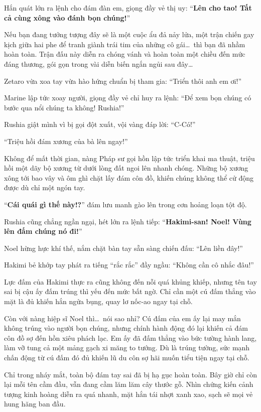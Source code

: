 \documentclass[../main.tex]{subfiles}
\begin{document}
Hắn quát lớn ra lệnh cho đám đàn em, giọng đầy vẻ thị uy: ``\textbf{Lên cho tao! Tất cả cùng xông vào đánh bọn chúng!}''

Nếu bạn đang tưởng tượng đây sẽ là một cuộc ẩu đả nảy lửa, một trận chiến gay kịch giữa hai phe để tranh giành trái tim của những cô gái\dots\ thì bạn đã nhầm hoàn toàn. Trận đấu này diễn ra chóng vánh và hoàn toàn một chiều đến mức đáng thương, gói gọn trong vài diễn biến ngắn ngủi sau đây\dots

Zetaro vừa xoa tay vừa hào hứng chuẩn bị tham gia: ``Triển thôi anh em ơi!''

Marine lập tức xoay người, giọng đầy vẻ chỉ huy ra lệnh: ``Để xem bọn chúng có bước qua nổi chúng ta không! Rushia!''

Rushia giật mình vì bị gọi đột xuất, vội vàng đáp lời: ``C-Có!''

``Triệu hồi đám xương của bà lên ngay!''

Không để mất thời gian, nàng Pháp sư gọi hồn lập tức triển khai ma thuật, triệu hồi một dãy bộ xương từ dưới lòng đất ngoi lên nhanh chóng. Những bộ xương xông tới bao vây và ôm ghì chặt lấy đám côn đồ, khiến chúng không thể cử động được dù chỉ một ngón tay.

``\textbf{Cái quái gì thế này!?}'' đám lưu manh gào lên trong cơn hoảng loạn tột độ.

Rushia cũng chẳng ngần ngại, hét lớn ra lệnh tiếp: ``\textbf{Hakimi-san! Noel! Vùng lên đấm chúng nó đi!}''

Noel hừng hực khí thế, nắm chặt bàn tay sẵn sàng chiến đấu: ``Lên liền đây!''

Hakimi bẻ khớp tay phát ra tiếng ``rắc rắc'' đầy ngầu: ``Không cần cô nhắc đâu!''

Lực đấm của Hakimi thực ra cũng không đến nỗi quá khủng khiếp, nhưng tên tay sai bị cậu ấy đấm trúng thì yếu đến mức bất ngờ. Chỉ cần một cú đấm thẳng vào mặt là đủ khiến hắn ngửa bụng, quay lơ nốc-ao ngay tại chỗ.

Còn với nàng hiệp sĩ Noel thì\dots\ nói sao nhỉ? Cú đấm của em ấy lại may mắn không trúng vào người bọn chúng, nhưng chính hành động đó lại khiến cả đám côn đồ sợ đến hồn xiêu phách lạc. Em ấy đã đấm thẳng vào bức tường hành lang, làm vỡ tung cả một mảng gạch xi măng to tướng. Dù là trúng tường, sức mạnh chấn động từ cú đấm đó đủ khiến lũ du côn sợ hãi muốn tiểu tiện ngay tại chỗ.

Chỉ trong nháy mắt, toàn bộ đám tay sai đã bị hạ gục hoàn toàn. Bây giờ chỉ còn lại mỗi tên cầm đầu, vẫn đang cầm lăm lăm cây thước gỗ. Nhìn chứng kiến cảnh tượng kinh hoàng diễn ra quá nhanh, mặt hắn tái nhợt xanh xao, sạch sẽ mọi vẻ hung hăng ban đầu.
\end{document}
